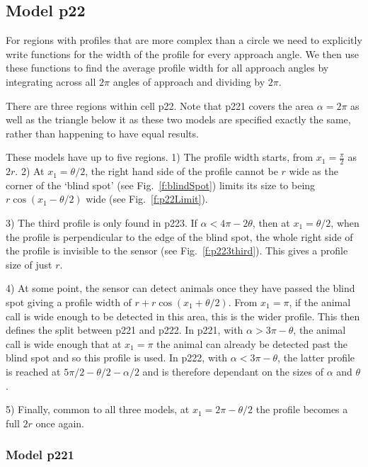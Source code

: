 

\subsection{Model p22} \label{p22}

For regions with profiles that are more complex than a circle we need to explicitly write functions for the width of the profile for every approach angle. We then use these functions to find the average profile width for all approach angles by integrating across all $2\pi$ angles of approach and dividing by $2\pi$. 



There are three regions within cell p22. Note that p221 covers the area $\alpha=2\pi$ as well as the triangle below it as these two models are specified exactly the same, rather than happening to have equal results.

These models have up to five regions. 1) The profile width starts, from $x_1=\frac{\pi}{2}$ as $2r$. 2) At $x_1 = \theta/2$, the right hand side of the profile cannot be $r$ wide as the corner of the `blind spot' (see Fig.~\ref{f:blindSpot}) limits its size to being $r\cos(x_1 - \theta/2)$ wide (see Fig.~\ref{f:p22Limit}). 

3) The third profile is only found in p223. If $\alpha < 4\pi - 2\theta$, then at $x_1=\theta/2$, when the profile is perpendicular to the edge of the blind spot, the whole right side of the profile is invisible to the sensor (see Fig.~\ref{f:p223third}). This gives a profile size of just $r$.

4) At some point, the sensor can detect animals once they have passed the blind spot giving a profile width of $r + r\cos(x_1 + \theta/2)$. From $x_1=\pi$, if the animal call is wide enough to be detected in this area, this is the wider profile. This then defines the split between p221 and p222. In p221, with $\alpha > 3\pi - \theta$, the animal call is wide enough that at $x_1=\pi$ the animal can already be detected past the blind spot and so this profile is used. In p222, with $\alpha < 3\pi - \theta$, the latter profile is reached at $5\pi/2 - \theta/2 - \alpha/2$ and is therefore dependant on the sizes of $\alpha$ and $\theta$. 

5) Finally, common to all three models, at $x_1 = 2\pi - \theta/2$ the profile becomes a full $2r$ once again.


\subsubsection{Model p221} \label{p221}

